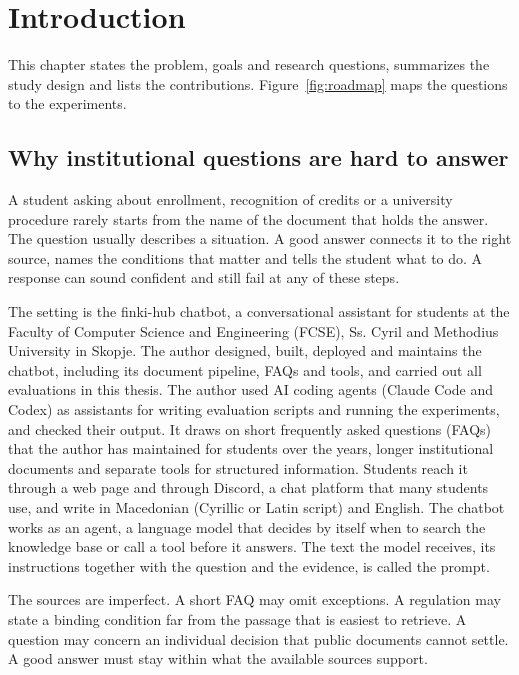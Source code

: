 \section{Introduction}
\label{ch:introduction}

This chapter states the problem, goals and research questions, summarizes the study design and lists the contributions. Figure~\ref{fig:roadmap} maps the questions to the experiments.

\subsection{Why institutional questions are hard to answer}

A student asking about enrollment, recognition of credits or a university procedure rarely starts from the name of the document that holds the answer. The question usually describes a situation. A good answer connects it to the right source, names the conditions that matter and tells the student what to do. A response can sound confident and still fail at any of these steps.

The setting is the finki-hub chatbot, a conversational assistant for students at the Faculty of Computer Science and Engineering (FCSE), Ss. Cyril and Methodius University in Skopje. The author designed, built, deployed and maintains the chatbot, including its document pipeline, FAQs and tools, and carried out all evaluations in this thesis. The author used AI coding agents (Claude Code and Codex) as assistants for writing evaluation scripts and running the experiments, and checked their output. It draws on short frequently asked questions (FAQs) that the author has maintained for students over the years, longer institutional documents and separate tools for structured information. Students reach it through a web page and through Discord, a chat platform that many students use, and write in Macedonian (Cyrillic or Latin script) and English. The chatbot works as an agent, a language model that decides by itself when to search the knowledge base or call a tool before it answers. The text the model receives, its instructions together with the question and the evidence, is called the prompt.

The sources are imperfect. A short FAQ may omit exceptions. A regulation may state a binding condition far from the passage that is easiest to retrieve. A question may concern an individual decision that public documents cannot settle. A good answer must stay within what the available sources support.

